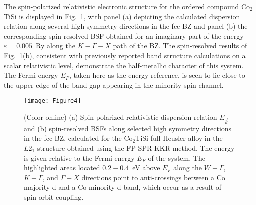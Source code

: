 \documentclass[aps,prb,twocolumn,superscriptaddress,showpacs]{revtex4}
\newcommand{\FG}[1]{Fig.~\ref{#1}}
\begin{document}
The spin-polarized relativistic electronic structure for
the ordered compound Co$_2$TiSi is displayed in \FG{Co2TiSiBSTR},
with panel (a) depicting the calculated dispersion relation along 
several high symmetry directions in the fcc BZ
and panel (b) the corresponding spin-resolved BSF 
obtained for an imaginary part of
the energy $\varepsilon=0.005$~Ry 
along the $K-\Gamma-X$ path of the BZ.
The spin-resolved results of \FG{Co2TiSiBSTR}(b),
consistent with previously reported 
band structure calculations on a
scalar relativistic level,\cite{BFB+10,SSK10} 
demonstrate the half-metallic character of this system.
The Fermi energy $E_F$, taken here as the energy reference,
is seen to lie close to the upper edge 
of the band gap appearing in the minority-spin channel.

\begin{figure}
  \centering
  \texttt{[image: Figure4]}
    \caption{(Color online)
    (a) Spin-polarized relativistic dispersion relation $E_{\vec k}$
    and (b) spin-resolved BSFs along selected high
    symmetry directions in the fcc BZ, calculated for the
    Co$_2$TiSi full Heusler alloy in the $L2_1$ structure
    obtained using the FP-SPR-KKR method. 
    The energy is given relative to the Fermi energy $E_F$
    of the system.
    The highlighted areas located $0.2-0.4$~eV above $E_F$
    along the $W-\Gamma$, $K-\Gamma$, and $\Gamma-X$
    directions point to anti-crossings between 
    a Co majority-d and a Co minority-d band, which
    occur as a result of spin-orbit coupling.}
  \label{Co2TiSiBSTR}
\end{figure}
\end{document}
